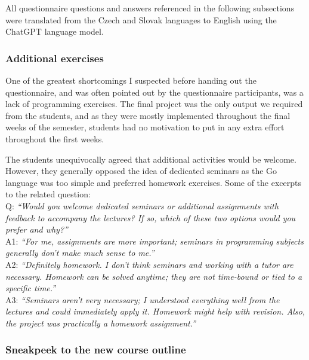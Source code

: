 \documentclass[
  digital,
  color,
  oneside,
  nosansbold,
  nocolorbold,
  nolof,
  nolot,
]{fithesis4}
\begin{document}
All questionnaire questions and answers referenced in the following subsections were translated from the Czech and Slovak languages to English using the ChatGPT\cite{chatgpt} language model.

\subsubsection{Additional exercises}\label{additional-exercises}

One of the greatest shortcomings I suspected before handing out the questionnaire, and was often pointed out by the questionnaire participants, was a lack of programming exercises. The final project was the only output we required from the students, and as they were mostly implemented throughout the final weeks of the semester, students had no motivation to put in any extra effort throughout the first weeks.

The students unequivocally agreed that additional activities would be welcome. However, they generally opposed the idea of dedicated seminars as the Go language was too simple and preferred homework exercises. Some of the excerpts to the related question: \\

\noindent
Q: \textit{\enquote{Would you welcome dedicated seminars or additional assignments with feedback to accompany the lectures? If so, which of these two options would you prefer and why?}} \\

\noindent
A1: \textit{\enquote{For me, assignments are more important; seminars in programming subjects generally don't make much sense to me.}} \\

\noindent
A2: \textit{\enquote{Definitely homework. I don't think seminars and working with a tutor are necessary. Homework can be solved anytime; they are not time-bound or tied to a specific time.}} \\

\noindent
A3: \textit{\enquote{Seminars aren't very necessary; I understood everything well from the lectures and could immediately apply it. Homework might help with revision. Also, the project was practically a homework assignment.}} \\

\subsubsection{Sneakpeek to the new course outline}\label{sneakpeek}
\end{document}
